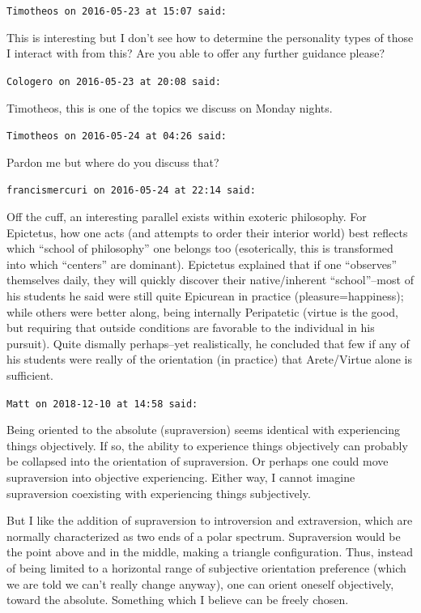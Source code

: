 \begin{footnotesize}
\begin{sffamily}
\texttt{Timotheos on 2016-05-23 at 15:07 said:}

This is interesting but I don't see how to determine the personality types of those I interact with from this? Are you able to offer any further guidance please?

\hfill

\texttt{Cologero on 2016-05-23 at 20:08 said:}

Timotheos, this is one of the topics we discuss on Monday nights.

\hfill

\texttt{Timotheos on 2016-05-24 at 04:26 said:}

Pardon me but where do you discuss that?

\hfill

\texttt{francismercuri on 2016-05-24 at 22:14 said:}

Off the cuff, an interesting parallel exists within exoteric philosophy. For Epictetus, how one acts (and attempts to order their interior world) best reflects which ``school of philosophy'' one belongs too (esoterically, this is transformed into which ``centers'' are dominant). Epictetus explained that if one ``observes'' themselves daily, they will quickly discover their native/inherent ``school''--most of his students he said were still quite Epicurean in practice (pleasure=happiness); while others were better along, being internally Peripatetic (virtue is the good, but requiring that outside conditions are favorable to the individual in his pursuit). Quite dismally perhaps--yet realistically, he concluded that few if any of his students were really of the orientation (in practice) that Arete/Virtue alone is sufficient.

\hfill

\texttt{Matt on 2018-12-10 at 14:58 said:}

Being oriented to the absolute (supraversion) seems identical with experiencing things objectively. If so, the ability to experience things objectively can probably be collapsed into the orientation of supraversion. Or perhaps one could move supraversion into objective experiencing. Either way, I cannot imagine supraversion coexisting with experiencing things subjectively.

But I like the addition of supraversion to introversion and extraversion, which are normally characterized as two ends of a polar spectrum. Supraversion would be the point above and in the middle, making a triangle configuration. Thus, instead of being limited to a horizontal range of subjective orientation preference (which we are told we can't really change anyway), one can orient oneself objectively, toward the absolute. Something which I believe can be freely chosen.


\hfill

\end{sffamily}
\end{footnotesize}

